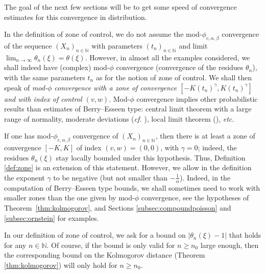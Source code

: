 \documentclass[envcountsame]{svmult}
\newcommand{\N}{\mathbb{N}}
\begin{document}
The goal of the next few sections will be to get some speed of convergence estimates
for this convergence in distribution.

\begin{remark}
In the definition of zone of control, we do not assume the mod-$\phi_{c,\alpha,\beta}$ convergence of the sequence $(X_{n})_{n \in \N}$ with parameters $(t_n)_{n \in \N}$ and limit $\lim_{n \to \infty} \theta_n(\xi) = \theta(\xi)$. However, in almost all the examples considered, we shall indeed have (complex) mod-$\phi$ convergence (convergence of the residues $\theta_n$), with the same parameters $t_n$ as for the notion of zone of control. We shall then speak of \emph{mod-$\phi$ convergence with a zone of convergence $[-K(t_n)^\gamma,K(t_n)^\gamma]$ and with index of control $(v,w)$}. Mod-$\phi$ convergence implies other probabilistic results than estimates of Berry--Esseen type: central limit theorem with a large range of normality, moderate deviations (\emph{cf.} \cite{FMN16}), local limit theorem (\cite{DKN11}), \emph{etc.}
\end{remark}

\begin{remark}
If one has mod-$\phi_{c,\alpha,\beta}$ convergence of $(X_n)_{n \in \N}$, then there is at least a zone of convergence $[-K,K]$ of index $(v,w)=(0,0)$, with $\gamma=0$; indeed, the residues $\theta_n(\xi)$ stay locally bounded under this hypothesis. Thus, Definition \ref{def:zone} is an extension of this statement. However, we allow in the definition the exponent $\gamma$ to be negative (but not smaller than $-\frac{1}{\alpha}$). Indeed, in the computation of Berry--Esseen type bounds, we shall sometimes need to work with smaller zones than the one given by mod-$\phi$ convergence,
see the hypotheses of Theorem~\ref{thm:kolmogorov}, and Sections \ref{subsec:compoundpoisson} and \ref{subsec:ornstein} for examples.
\end{remark}

\begin{remark}
In our definition of zone of control, we ask for a bound on $|\theta_n(\xi)-1|$ that holds for any $n \in \N$. Of course, if the bound is only valid for $n \geq n_0$ large enough, then the corresponding bound on the Kolmogorov distance (Theorem \ref{thm:kolmogorov}) will only hold for $n \geq n_0$.
\end{remark}
\end{document}
